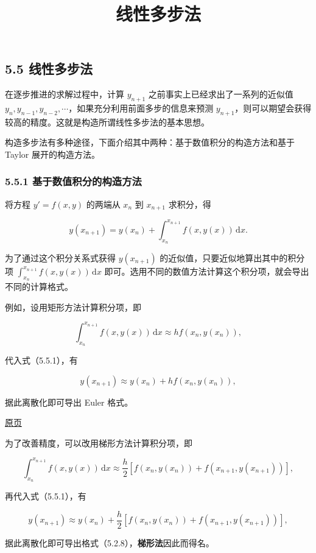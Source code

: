 \documentclass[
  10pt,
  fontset=fandol]{ctexart}
\title{线性多步法}
\author{}
\date{}
\begin{document}
\maketitle

\subsection{5.5 线性多步法}\label{ux7ebfux6027ux591aux6b65ux6cd5}

在逐步推进的求解过程中，计算 \(y_{n+1}\) 之前事实上已经求出了一系列的近似值 \(y_n,y_{n-1},y_{n-2},\cdots\)，如果充分利用前面多步的信息来预测 \(y_{n+1}\)，则可以期望会获得较高的精度。这就是构造所谓线性多步法的基本思想。

构造多步法有多种途径，下面介绍其中两种：基于数值积分的构造方法和基于 Taylor 展开的构造方法。

\subsubsection{5.5.1 基于数值积分的构造方法}\label{ux57faux4e8eux6570ux503cux79efux5206ux7684ux6784ux9020ux65b9ux6cd5}

将方程 \(y'=f(x,y)\) 的两端从 \(x_n\) 到 \(x_{n+1}\) 求积分，得

\[
y(x_{n+1})=y(x_n)+\int_{x_n}^{x_{n+1}}f(x,y(x))\,\mathrm dx.
\tag{5.5.1}
\]

为了通过这个积分关系式获得 \(y(x_{n+1})\) 的近似值，只要近似地算出其中的积分项 \(\int_{x_n}^{x_{n+1}}f(x,y(x))\,\mathrm dx\) 即可。选用不同的数值方法计算这个积分项，就会导出不同的计算格式。

例如，设用矩形方法计算积分项，即

\[
\int_{x_n}^{x_{n+1}}f(x,y(x))\,\mathrm dx\approx hf(x_n,y(x_n)),
\]

代入式（5.5.1），有

\[
y(x_{n+1})\approx y(x_n)+hf(x_n,y(x_n)),
\]

据此离散化即可导出 Euler 格式。

\href{../../source-images/pdf-138.jpeg}{原页}

为了改善精度，可以改用梯形方法计算积分项，即

\[
\int_{x_n}^{x_{n+1}}f(x,y(x))\,\mathrm dx\approx\frac h2[f(x_n,y(x_n))+f(x_{n+1},y(x_{n+1}))],
\]

再代入式（5.5.1），有

\[
y(x_{n+1})\approx y(x_n)+\frac h2[f(x_n,y(x_n))+f(x_{n+1},y(x_{n+1}))],
\]

据此离散化即可导出格式（5.2.8），\textbf{梯形法}因此而得名。
\end{document}
